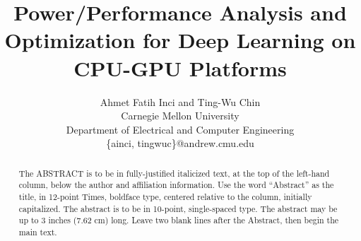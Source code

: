 \documentclass[times, 10pt,twocolumn]{article}
\begin{document}
\title{Power/Performance Analysis and Optimization for Deep Learning on CPU-GPU Platforms}

\author{Ahmet Fatih Inci and Ting-Wu Chin  \\
Carnegie Mellon University\\ Department of Electrical and Computer Engineering \\ \{ainci, tingwuc\}@andrew.cmu.edu\\
}
\maketitle
\thispagestyle{empty}

\begin{abstract}
   The ABSTRACT is to be in fully-justified italicized text, at the top 
   of the left-hand column, below the author and affiliation 
   information. Use the word ``Abstract'' as the title, in 12-point 
   Times, boldface type, centered relative to the column, initially 
   capitalized. The abstract is to be in 10-point, single-spaced type. 
   The abstract may be up to 3 inches (7.62 cm) long. Leave two blank 
   lines after the Abstract, then begin the main text. 
\end{abstract}







\end{document}
